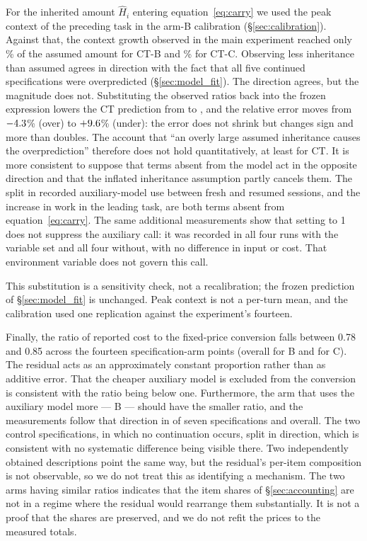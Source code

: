 \documentclass[a4paper,11pt]{article}
\newcommand{\spec}[1]{\texttt{\detokenize{#1}}}
\begin{document}
For the inherited amount $\widehat H_i$ entering equation~\eqref{eq:carry} we used the peak context of the preceding task in the arm-B calibration (\S\ref{sec:calibration}). Against that, the context growth observed in the main experiment reached only \CarryShareB\% of the assumed amount for CT-B and \CarryShareC\% for CT-C. Observing less inheritance than assumed agrees in direction with the fact that all five continued specifications were overpredicted (\S\ref{sec:model_fit}). The direction agrees, but the magnitude does not. Substituting the observed ratios back into the frozen expression lowers the CT prediction from \SubHatFrozen{} to \SubHatObserved{}, and the relative error moves from $-4.3$\% (over) to $+9.6$\% (under): the error does not shrink but changes sign and more than doubles. The account that ``an overly large assumed inheritance causes the overprediction'' therefore does not hold quantitatively, at least for CT. It is more consistent to suppose that terms absent from the model act in the opposite direction and that the inflated inheritance assumption partly cancels them. The split in recorded auxiliary-model use between fresh and resumed sessions, and the increase in work in the leading task, are both terms absent from equation~\eqref{eq:carry}. The same additional measurements show that setting \spec{DISABLE_NON_ESSENTIAL_MODEL_CALLS} to 1 does not suppress the auxiliary call: it was recorded in all four runs with the variable set and all four without, with no difference in input or cost. That environment variable does not govern this call.

This substitution is a sensitivity check, not a recalibration; the frozen prediction of \S\ref{sec:model_fit} is unchanged. Peak context is not a per-turn mean, and the calibration used one replication against the experiment's fourteen.

Finally, the ratio of reported cost to the fixed-price conversion falls between 0.78 and 0.85 across the fourteen specification-arm points (overall \ResidualRatioB{} for B and \ResidualRatioC{} for C). The residual acts as an approximately constant proportion rather than as additive error. That the cheaper auxiliary model is excluded from the conversion is consistent with the ratio being below one. Furthermore, the arm that uses the auxiliary model more --- B --- should have the smaller ratio, and the measurements follow that direction in \ResidualDirSpecs{} of seven specifications and overall. The two control specifications, in which no continuation occurs, split in direction, which is consistent with no systematic difference being visible there. Two independently obtained descriptions point the same way, but the residual's per-item composition is not observable, so we do not treat this as identifying a mechanism. The two arms having similar ratios indicates that the item shares of \S\ref{sec:accounting} are not in a regime where the residual would rearrange them substantially. It is not a proof that the shares are preserved, and we do not refit the prices to the measured totals.
\end{document}
